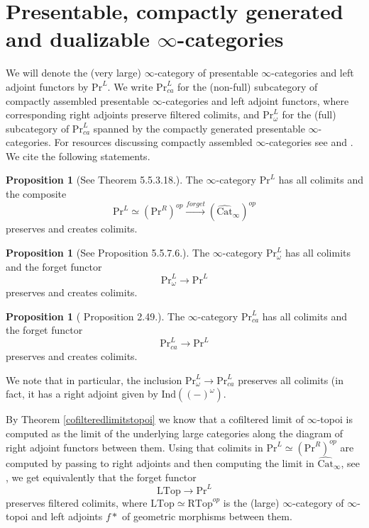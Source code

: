 \documentclass[10pt]{amsart}
\theoremstyle{definition}
\newtheorem{proposition}[theorem]{Proposition}
\begin{document}
\section{Presentable, compactly generated and dualizable $\infty$-categories}

We will denote the (very large) $\infty$-category of presentable $\infty$-categories and left adjoint functors by $\mathrm{Pr}^L$. We write  $\mathrm{Pr}^L_{ca}$ for the (non-full) subcategory of compactly assembled presentable $\infty$-categories and left adjoint functors, where corresponding right adjoints preserve filtered colimits, and $\mathrm{Pr}^L_{\omega}$ for the (full) subcategory of $\mathrm{Pr}^L_{ca}$ spanned by the compactly generated presentable $\infty$-categories. For resources discussing compactly assembled $\infty$-categories see \cite{krause_nikolaus_puetzstueck} and \cite{ramzi2024dualizablepresentableinftycategories}. We cite the following statements.


\begin{proposition}[See \cite{luriehtt} Theorem 5.5.3.18.] \label{collectionofcolimitspresentable}
The $\infty$-category $\mathrm{Pr}^L$ has all colimits and the composite
$$\mathrm{Pr}^L \simeq (\mathrm{Pr}^R)^{op} \xrightarrow{forget} (\widehat{\mathrm{Cat}}_\infty)^{op} $$
preserves and creates colimits.
\end{proposition}

\begin{proposition}[See \cite{luriehtt} Proposition 5.5.7.6.]
The $\infty$-category $\mathrm{Pr}^L_{\omega}$ has all colimits and the forget functor
$$\mathrm{Pr}^L_\omega \rightarrow \mathrm{Pr}^L$$
preserves and creates colimits.
\end{proposition}

\begin{proposition}[\cite{ramzi2024dualizablepresentableinftycategories} Proposition 2.49.]
The $\infty$-category $\mathrm{Pr}^L_{ca}$ has all colimits and the forget functor
$$\mathrm{Pr}^L_{ca} \rightarrow \mathrm{Pr}^L$$
preserves and creates colimits.
\end{proposition}

We note that in particular, the inclusion $\mathrm{Pr}^L_{\omega} \rightarrow \mathrm{Pr}^L_{ca}$ preserves all colimits (in fact, it has a right adjoint given by $\mathrm{Ind}((-)^{\omega})$.

By Theorem \ref{cofilteredlimitstopoi} we know that a cofiltered limit of $\infty$-topoi is computed as the limit of the underlying large categories along the diagram of right adjoint functors between them. Using that colimits in $\mathrm{Pr}^L \simeq (\mathrm{Pr}^R)^{op}$ are computed by passing to right adjoints and then computing the limit in $\widehat{\mathrm{Cat}}_\infty$, see \cite[Theorem 5.5.3.18.]{luriehtt}, we get equivalently that the forget functor
$$\mathrm{LTop} \rightarrow \mathrm{Pr}^L$$
preserves filtered colimits, where $\mathrm{LTop} \simeq \mathrm{RTop}^{op}$ is the (large) $\infty$-category of $\infty$-topoi and left adjoints $f*$ of geometric morphisms between them.
\end{document}
